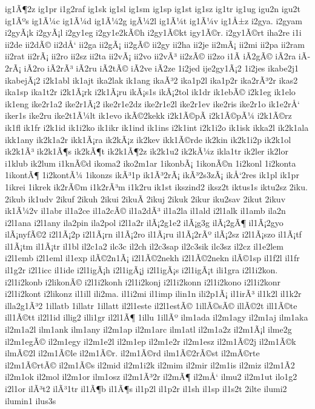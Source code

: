 {ig1Ã¶2z
ig1pr
i1g2raf
ig1sk
ig1sl
ig1sm
ig1sp
ig1st
ig1sz
ig1tr
ig1ug
igu2n
igu2t
ig1Ãºs
ig1Ã¼c
ig1Ã¼d
ig1Ã¼2g
igÃ¼2l
ig1Ã¼t
ig1Ã¼v
ig1Å±z
i2gya.
i2gyam
i2gyÃ¡k
i2gyÃ¡l
i2gy1eg
i2gy1e2kÃ©h
i2gy1Ã©kt
igy1Ã©r.
i2gy1Ã©rt
iha2re
i1i
ii2de
ii2dÃ©
ii2dÅ‘
ii2ga
ii2gÃ¡
ii2gÃ©
ii2gy
ii2ha
ii2je
ii2mÃ¡
ii2mi
ii2pa
ii2ram
ii2rat
ii2rÃ¡
ii2ro
ii2sz
ii2ta
ii2vÃ¡
ii2vo
ii2vÃ³
ii2zÃ©
ii2zo
i1Ã­
iÃ­2gÃ©
iÃ­2ra
iÃ­2rÃ¡
iÃ­2ro
iÃ­2rÃ³
iÃ­2ru
iÃ­2tÃ©
iÃ­2ve
iÃ­2ze
1i2jed
ije2gy1Ã¡2
1i2jes
ikabe2j1
ikabejÃ¡2
i2k1abl
ik1ajt
ika2lak
ik1ang
ikaÃ³2
ika1p2l
ika1p2r
ika2rÃ³2r
ikas2
ika1sp
ika1t2r
i2k1Ã¡rk
i2k1Ã¡ru
ikÃ¡s1s
ikÃ¡2tol
ik1dr
ik1ebÃ©
i2k1eg
ik1elo
ik1eng
ike2r1a2
ike2r1Ã¡2
ike2r1e2dz
ike2r1e2l
ike2r1ev
ike2ris
ike2r1o
ik1e2rÅ‘
iker1s
ike2ru
ike2t1Ã¼lt
ik1evo
ikÃ©2kekk
i2k1Ã©pÃ­
i2k1Ã©pÃ¼
i2k1Ã©rz
ik1fl
ik1fr
i2k1id
ik1i2ko
ik1ikr
ik1ind
ik1ins
i2k1int
i2k1i2o
ik1isk
ikka2l
ik2k1ala
ikk1any
ik2k1a2r
ikk1Ã¡ra
ik2kÃ¡z
ik2kev
ikk1Ã©rde
ik2kin
ik2k1i2p
ik2k1ol
ik2k1Ã³
ik2k1Ã¶s
ik2kÃ¶t
ik2k1Ã¶2z
ik2k1u2
ik2kÃ¼z
ikla1tr
ik2ler
ik2lor
i1klub
ik2lum
i1knÃ©d
ikoma2
iko2m1ar
1ikonbÃ¡
1ikonÃ©n
1i2konl
1i2konta
1ikontÃ¶
1i2kontÃ¼
1ikonzs
ikÃ³1p
ik1Ã³2rÃ¡
ikÃ³2s3zÃ¡
ikÅ‘2res
ik1pl
ik1pr
1ikrei
1ikrek
ik2rÃ©m
i1k2rÃ³m
i1k2ru
ik1st
ikszind2
iksz2t
iktus1s
iktu2sz
2iku.
2ikub
ik1udv
2ikuf
2ikuh
2ikui
2ikuÃ­
2ikuj
2ikuk
2ikur
iku2sav
2ikut
2ikuv
ik1Ã¼2v
il1abr
il1a2ce
il1a2cÃ©
il1a2dÃ³
il1a2la
il1ald
i2l1alk
il1amb
ila2n
i2l1ana
i2l1any
ila2pin
ila2pol
i2l1a2r
ilÃ¡2g1e2
ilÃ¡g3g
ilÃ¡2gÃ¶
il1Ã¡2gyo
ilÃ¡nyfÃ©2
i2l1Ã¡2p
i2l1Ã¡rn
il1Ã¡2ro
il1Ã¡ru
il1Ã¡2rÃº
ilÃ¡2sz
i2l1Ã¡szo
il1Ã¡tf
il1Ã¡tm
il1Ã¡tr
il1bl
il2c1a2
ilc3c
il2ch
il2c3sap
il2c3sik
ilc3sz
il2cz
il1e2lem
i2l1emb
i2l1eml
il1exp
ilÃ©2n1Ã¡
i2l1Ã©2nekh
i2l1Ã©2nekn
ilÃ©1sp
il1f2l
il1fr
il1g2r
i2l1icc
il1ide
i2l1igÃ¡h
i2l1igÃ¡j
i2l1igÃ¡s
i2l1igÃ¡t
ili1gra
i2l1i2kon.
i2l1i2konb
i2likonÃ©
i2l1i2konh
i2l1i2konj
i2l1i2konn
i2l1i2kono
i2l1i2konr
i2l1i2kont
i2likonz
il1ill
ili2ma.
il1i2mi
il1imp
ilin1n
ili2p1Ã¡
il1irÃ³
il1k2l
il1k2r
illa2g1Ã³2
1illatb
1illatr
1illatt
il2l1este
il2l1estÃ©
1illÃ©sÃ©
illÃ©2t
ill1Ã©te
ill1Ã©tt
il2l1id
illig2
illi1gr
il2l1Ã¶
1illu
1illÃº
ilm1ada
il2m1agy
il2m1aj
ilm1aka
il2m1a2l
ilm1ank
ilm1any
il2m1ap
il2m1arc
ilm1atl
il2m1a2z
il2m1Ã¡l
ilme2g
il2m1egÃ©
il2m1egy
il2m1e2l
il2m1ep
il2m1e2r
il2m1esz
il2m1Ã©2j
il2m1Ã©k
ilmÃ©2l
il2m1Ã©le
il2m1Ã©r.
il2m1Ã©rd
ilm1Ã©2rÃ©st
il2mÃ©rte
il2m1Ã©rtÃ©
il2m1Ã©s
il2mid
il2m1i2k
il2mim
il2mir
il2m1is
il2miz
il2m1Ã­2
il2m1ok
il2mol
il2m1or
ilm1osz
il2m1Ã³2r
il2mÃ¶
il2mÅ‘
ilmu2
il2m1ut
ilo1g2
i2l1or
ilÃ³t2
ilÃ³1tr
il1Ã¶b
il1Ã¶s
il1p2l
il1p2r
il1sh
il1sp
il1s2t
2ilte
ilumi2
ilumin1
ilus3s
}
